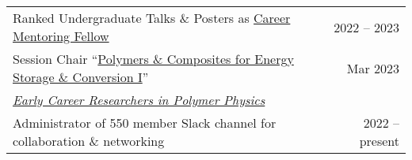 \documentclass[letterpaper,11pt]{article}
\begin{document}
\begin{longtable}{@{}p{}r@{}}
  \hspace{7mm} Ranked Undergraduate Talks \& Posters as \href{https://www.aps.org/careers/guidance/mentoring.cfm}{Career Mentoring Fellow}                                                                        & 2022 -- 2023                                                                \\ [3pt]
  \hspace{7mm} Session Chair ``\href{https://meetings.aps.org/Meeting/MAR23/Session/Y15}{Polymers \& Composites for Energy Storage \& Conversion I}''                                                & Mar 2023                                                                    \\ [4pt]
  \multicolumn{2}{l}{\hspace{1mm} \textit{\href{https://sites.google.com/view/polymerphysics/}{Early Career Researchers in Polymer Physics}}}                                                                                                                                                   \\ [3pt]
  \hspace{7mm} Administrator of 550 member Slack channel for collaboration \& networking                                                                                                                 & 2022 -- present                                                             \\ [3pt]

\end{longtable}
\end{document}
